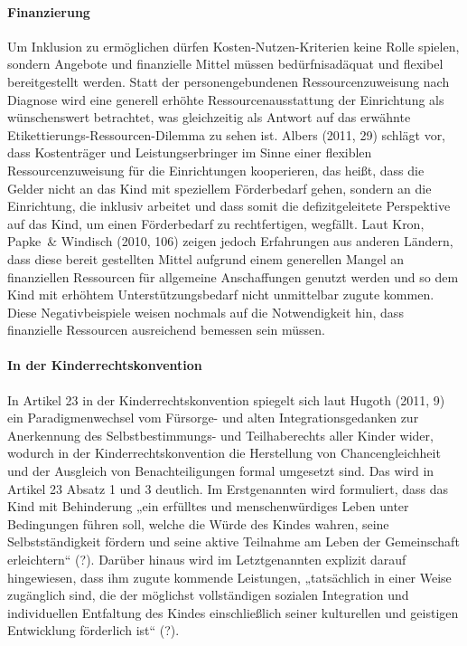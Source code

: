 \paragraph{Finanzierung}
Um Inklusion zu ermöglichen dürfen Kosten-Nutzen-Kriterien keine Rolle spielen, sondern Angebote und finanzielle Mittel müssen bedürfnisadäquat und flexibel bereitgestellt werden. Statt der personengebundenen Ressourcenzuweisung nach Diagnose wird eine generell erhöhte Ressourcenausstattung der Einrichtung als wünschenswert betrachtet, was gleichzeitig als Antwort auf das erwähnte Etikettierungs-Ressourcen-Dilemma zu sehen ist. 
Albers (2011, 29) schlägt vor, dass Kostenträger und Leistungserbringer im Sinne einer flexiblen Ressourcenzuweisung für die Einrichtungen kooperieren, das heißt, dass die Gelder nicht an das Kind mit speziellem Förderbedarf gehen, sondern an die Einrichtung, die inklusiv arbeitet und dass somit die defizitgeleitete Perspektive auf das Kind, um einen Förderbedarf zu rechtfertigen, wegfällt. Laut Kron, Papke~\& Windisch (2010, 106) zeigen jedoch Erfahrungen aus anderen Ländern, dass diese bereit gestellten Mittel aufgrund einem generellen Mangel an finanziellen Ressourcen für allgemeine Anschaffungen genutzt werden und so dem Kind mit erhöhtem Unterstützungsbedarf nicht unmittelbar zugute kommen. Diese Negativbeispiele weisen nochmals auf die Notwendigkeit hin, dass finanzielle Ressourcen ausreichend bemessen sein müssen. 

\paragraph{In der Kinderrechtskonvention}
In Artikel 23 in der Kinderrechtskonvention spiegelt sich laut Hugoth (2011, 9) ein Paradigmenwechsel vom Fürsorge- und alten Integrationsgedanken zur Anerkennung des Selbstbestimmungs- und Teilhaberechts aller Kinder wider, wodurch in der Kinderrechtskonvention die Herstellung von Chancengleichheit und der Ausgleich von Benachteiligungen formal umgesetzt sind. Das wird in Artikel 23 Absatz 1 und 3 deutlich. Im Erstgenannten wird formuliert, dass das Kind mit Behinderung „ein erfülltes und menschenwürdiges Leben unter Bedingungen führen soll, welche die Würde des Kindes wahren, seine Selbstständigkeit fördern und seine aktive Teilnahme am Leben der Gemeinschaft erleichtern“ (?). Darüber hinaus wird im Letztgenannten explizit darauf hingewiesen, dass ihm zugute kommende Leistungen, „tatsächlich in einer Weise zugänglich sind, die der möglichst vollständigen sozialen Integration und individuellen Entfaltung des Kindes einschließlich seiner kulturellen und geistigen Entwicklung förderlich ist“ (?). 

